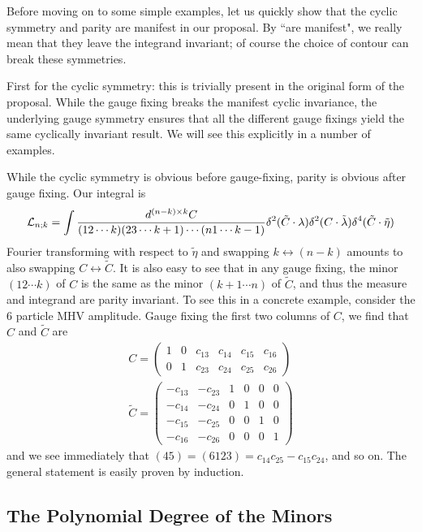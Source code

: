 \documentclass[12pt]{article}
\newcommand{\be}{\begin{eqnarray}}
\newcommand{\ee}{\end{eqnarray}}
\begin{document}
Before moving on to some simple examples, let us quickly show that the cyclic symmetry and parity are manifest in
our proposal. By ``are manifest", we really mean that they leave the integrand invariant; of course the choice of contour can break these symmetries.

First for the cyclic symmetry: this is trivially present in the
original form of the proposal. While the gauge fixing breaks the
manifest cyclic invariance, the underlying gauge symmetry ensures
that all the different gauge fixings yield the same cyclically
invariant result. We will see this explicitly in a number of
examples.

While the cyclic symmetry is obvious before gauge-fixing, parity is
obvious after gauge fixing. Our integral is \be {\cal L}_{n;k} =
\int \frac{d^{(n-k) \times k} C}{(12 \cdots k) (23 \cdots k+1)
\cdots (n 1 \cdots k-1)} \delta^2(\tilde C \cdot \lambda) \delta^2
(C \cdot \tilde \lambda) \delta^4(\tilde C \cdot \tilde \eta) \ee
Fourier transforming with respect to $\tilde \eta$ and swapping $k
\leftrightarrow (n-k)$ amounts to also swapping $C \leftrightarrow
\tilde C$. It is also easy to see that in any gauge fixing, the minor
$(12\cdots k)$ of $C$ is the same as the minor $(k+1 \cdots n)$ of
$\tilde C$, and thus the measure and integrand are parity invariant.  To
see this in a concrete example, consider the 6 particle MHV
amplitude. Gauge fixing the first two columns of $C$, we find that $C$
and $\tilde C$ are \be
C = \left(\begin{array}{cccccc} 1 & 0  &  c_{13} & c_{14} &  c_{15} & c_{16} \\ 0 & 1 &  c_{23} & c_{24} &  c_{25} & c_{26}  \end{array} \right) \\
\tilde C = \left(\begin{array}{cccccc} -c_{13} & -c_{23}  & 1 & 0 & 0 & 0 \\ -c_{14} & -c_{24}  & 0 & 1 & 0 & 0 \\
-c_{15} & -c_{25}  & 0 & 0 & 1 & 0 \\
-c_{16} & -c_{26}  & 0 & 0 & 0 & 1  \end{array} \right)
\ee
and  we see immediately that $(45)=(6123) = c_{14}c_{25}-c_{15}c_{24}$, and so on. The general statement is easily proven by induction.

\subsection{The Polynomial Degree of the Minors}
\end{document}
